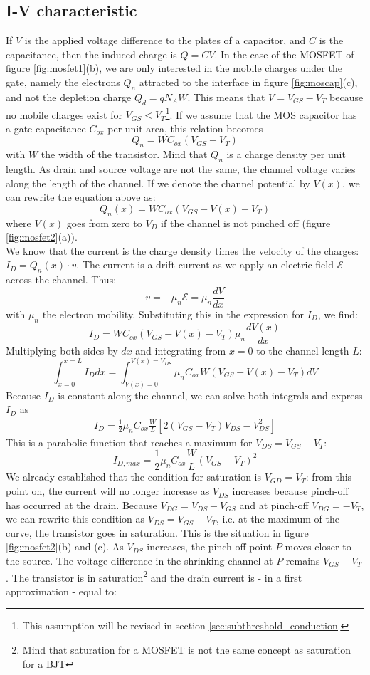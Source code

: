 \subsection{I-V characteristic}
\label{sec:MOS_IV}
If $V$ is the applied voltage difference to the plates of a capacitor, and $C$ is the  capacitance, then the  induced charge is $Q = C V$. In the case of the MOSFET of figure \ref{fig:mosfet1}(b), we are only interested in the mobile charges under the gate, namely the electrons $Q_n$ attracted to the interface in figure \ref{fig:moscap}(c), and not the depletion charge $Q_d = q N_A W$. This means that $V = V_{GS} - V_T$ because no mobile charges exist for $V_{GS} < V_T$\footnote{This assumption will be revised in section \ref{sec:subthreshold_conduction}}. If we assume that the MOS capacitor has a gate capacitance $C_{ox}$ per unit area, this relation becomes
$$Q_n = W C_{ox} (V_{GS} - V_T)$$
with $W$ the width of the transistor. Mind that $Q_n$ is a charge density per unit length. As drain and source voltage are not the same, the channel voltage varies along the length of the channel. If we denote the channel potential by $V(x)$, we can rewrite the equation above as:
$$Q_n(x) = W C_{ox} (V_{GS} - V(x) - V_T)$$
where $V(x)$ goes from zero to $V_D$ if the channel is not pinched off (figure \ref{fig:mosfet2}(a)).\\
We know that the current is the charge density times the velocity of the charges: $I_D = Q_n(x) \cdot v$. The current is a drift current as we apply an electric field $\mathcal{E}$ across the channel. Thus:
$$v = -\mu_n \mathcal{E} = \mu_n \frac{dV}{dx}$$
with $\mu_n$ the electron mobility. Substituting this in the expression for $I_D$, we find:
$$I_D = W C_{ox} (V_{GS} - V(x) - V_T) \mu_n \frac{dV(x)}{dx}$$
Multiplying both sides by $dx$ and integrating from $x = 0$ to the channel length  $L$:
$$
 \int_{x=0}^{x=L} I_D dx = \int_{V(x)=0}^{V(x)=V_{DS}} \mu_n C_{ox} W (V_{GS}-V(x)-V_T)dV 
$$
Because $I_D$ is constant along the channel, we can solve both integrals and express $I_D$ as
\begin{equation}
\begin{split}
    I_D = \frac{1}{2} \mu_n C_{ox} \frac{W}{L} [ 2(V_{GS} - V_T) V_{DS} - V_{DS}^2 ]
\end{split}
\end{equation}
This is a parabolic function that reaches a maximum for $V_{DS} = V_{GS} - V_T$:
$$I_{D, max} = \frac{1}{2} \mu_n C_{ox} \frac{W}{L} (V_{GS} - V_T)^2$$
We already established that the condition for saturation is $V_{GD} = V_T$: from this point on, the current will no longer increase as $V_{DS}$ increases because pinch-off has occurred at the drain. Because $V_{DG} = V_{DS} - V_{GS}$ and at pinch-off $V_{DG} = -V_T$, we can rewrite this condition as  $V_{DS} = V_{GS} - V_T$, i.e. at the maximum of the curve, the transistor goes in saturation. This is the situation in figure \ref{fig:mosfet2}(b) and (c). As $V_{DS}$ increases, the pinch-off point $P$ moves closer to the source. The voltage difference in the shrinking channel at $P$ remains $V_{GS} - V_T$. The transistor is in saturation\footnote{Mind that saturation for a MOSFET is not the same concept as saturation for a BJT} and the drain current is - in a first approximation - equal to:
